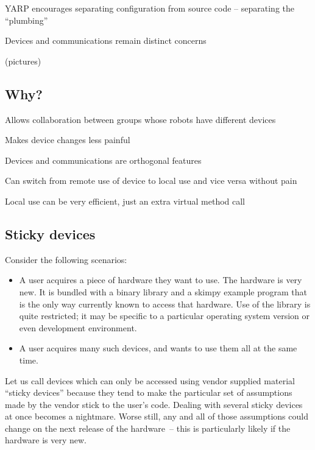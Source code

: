 YARP encourages separating configuration from source code -- separating
the ``plumbing''

Devices and communications remain distinct concerns

(pictures)


\subsection*{Why?}

Allows collaboration between groups whose robots have different devices

Makes device changes less painful

Devices and communications are orthogonal features

Can switch from remote use of device to local use and vice versa without pain

Local use can be very efficient, just an extra virtual method call





\subsection{Sticky devices}

Consider the following scenarios:

\begin{itemize}

\item A user acquires a piece of hardware they want to use.  The
hardware is very new.  It is bundled with a binary library and a
skimpy example program that is the only way currently known to access
that hardware.  Use of the library is quite restricted; it may be
specific to a particular operating system version or even development
environment.

\item A user acquires many such devices, and wants to use them
all at the same time.

\end{itemize}

Let us call devices which can only be accessed using vendor supplied
material ``sticky devices'' because they tend to make the particular
set of assumptions made by the vendor stick to the user's code.
Dealing with several sticky devices at once becomes a nightmare.
Worse still, any and all of those assumptions could change on the
next release of the hardware~-- this is particularly likely if the 
hardware is very new.

